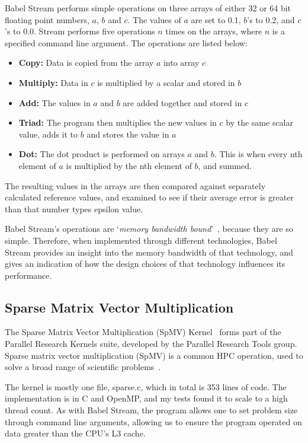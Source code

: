 Babel Stream performs simple operations on three arrays of either 32 or 64 bit floating point numbers, $a$, $b$ and $c$. The values of $a$ are set to 0.1, $b$'s to 0.2, and $c$'s to 0.0. Stream performs five operations $n$ times on the arrays, where $n$ is a specified command line argument. The operations are listed below:
\begin{itemize}
  \item \textbf{Copy:} Data is copied from the array $a$ into array $c$
  \item \textbf{Multiply:} Data in $c$ is multiplied by a scalar and stored in $b$
  \item \textbf{Add:} The values in $a$ and $b$ are added together and stored in $c$
  \item \textbf{Triad:} The program then multiplies the new values in $c$ by the same scalar value, adds it to $b$ and stores the value in $a$
  \item \textbf{Dot:} The dot product is performed on arrays $a$ and $b$. This is when every nth element of $a$ is multiplied by the nth element of $b$, and summed.
\end{itemize}
The resulting values in the arrays are then compared against separately calculated reference values, and examined to see if their average error is greater than that number types epsilon value.

Babel Stream's operations are `\textit{memory bandwidth bound}'~\cite{BabelStream}, because they are so simple. Therefore, when implemented through different technologies, Babel Stream provides an insight into the memory bandwidth of that technology, and gives an indication of how the design choices of that technology influences its performance.

\subsection{Sparse Matrix Vector Multiplication}

The Sparse Matrix Vector Multiplication (SpMV) Kernel~\cite{ParResSparse} forms part of the Parallel Research Kernels suite, developed by the Parallel Research Tools group. Sparse matrix vector multiplication (SpMV) is a common HPC operation, used to solve a broad range of scientific problems~\cite{Sedaghati:2015, spMVGPU, DBLP:journals}.

The kernel is mostly one file, sparse.c, which in total is 353 lines of code. The implementation is in C and OpenMP, and my tests found it to scale to a high thread count. As with Babel Stream, the program allows one to set problem size through command line arguments, allowing us to ensure the program operated on data greater than the CPU's L3 cache.

